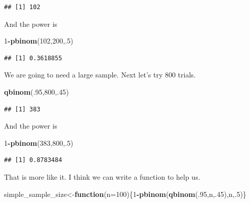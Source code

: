 \documentclass[]{book}
\newenvironment{Shaded}{\begin{snugshade}}{\end{snugshade}}
\newcommand{\KeywordTok}[1]{\textcolor[rgb]{0.13,0.29,0.53}{\textbf{#1}}}
\newcommand{\DataTypeTok}[1]{\textcolor[rgb]{0.13,0.29,0.53}{#1}}
\newcommand{\DecValTok}[1]{\textcolor[rgb]{0.00,0.00,0.81}{#1}}
\newcommand{\ControlFlowTok}[1]{\textcolor[rgb]{0.13,0.29,0.53}{\textbf{#1}}}
\newcommand{\OperatorTok}[1]{\textcolor[rgb]{0.81,0.36,0.00}{\textbf{#1}}}
\newcommand{\NormalTok}[1]{#1}
\theoremstyle{definition}
\theoremstyle{definition}
\theoremstyle{definition}
\theoremstyle{remark}
\begin{document}
\begin{verbatim}
## [1] 102
\end{verbatim}

And the power is

\begin{Shaded}
\begin{Highlighting}[]
\DecValTok{1}\OperatorTok{-}\KeywordTok{pbinom}\NormalTok{(}\DecValTok{102}\NormalTok{,}\DecValTok{200}\NormalTok{,.}\DecValTok{5}\NormalTok{)}
\end{Highlighting}
\end{Shaded}

\begin{verbatim}
## [1] 0.3618855
\end{verbatim}

We are going to need a large sample. Next let's try 800 trials.

\begin{Shaded}
\begin{Highlighting}[]
\KeywordTok{qbinom}\NormalTok{(.}\DecValTok{95}\NormalTok{,}\DecValTok{800}\NormalTok{,.}\DecValTok{45}\NormalTok{)}
\end{Highlighting}
\end{Shaded}

\begin{verbatim}
## [1] 383
\end{verbatim}

And the power is

\begin{Shaded}
\begin{Highlighting}[]
\DecValTok{1}\OperatorTok{-}\KeywordTok{pbinom}\NormalTok{(}\DecValTok{383}\NormalTok{,}\DecValTok{800}\NormalTok{,.}\DecValTok{5}\NormalTok{)}
\end{Highlighting}
\end{Shaded}

\begin{verbatim}
## [1] 0.8783484
\end{verbatim}

That is more like it. I think we can write a function to help us.

\begin{Shaded}
\begin{Highlighting}[]
\NormalTok{simple_sample_size<-}\ControlFlowTok{function}\NormalTok{(}\DataTypeTok{n=}\DecValTok{100}\NormalTok{)\{}\DecValTok{1}\OperatorTok{-}\KeywordTok{pbinom}\NormalTok{(}\KeywordTok{qbinom}\NormalTok{(.}\DecValTok{95}\NormalTok{,n,.}\DecValTok{45}\NormalTok{),n,.}\DecValTok{5}\NormalTok{)\}}
\end{Highlighting}
\end{Shaded}
\end{document}
